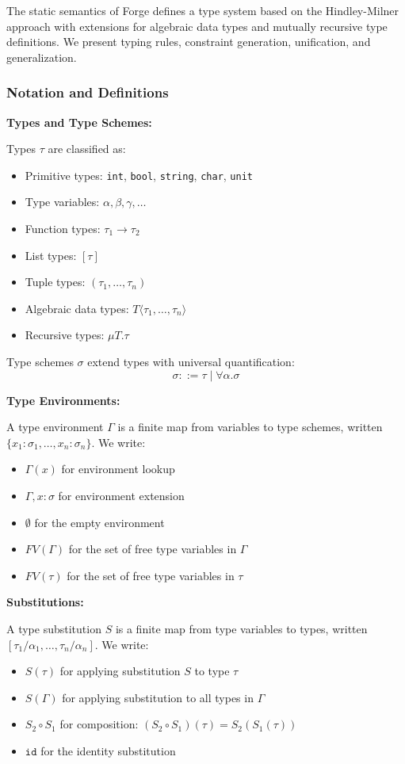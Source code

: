 \documentclass[conference,onecolumn]{IEEEtran}
\begin{document}
The static semantics of Forge defines a type system based on the Hindley-Milner approach with extensions for algebraic data types and mutually recursive type definitions. We present typing rules, constraint generation, unification, and generalization.

\subsubsection{Notation and Definitions}

\textbf{Types and Type Schemes:}

Types $\tau$ are classified as:
\begin{itemize}
\item Primitive types: \texttt{int}, \texttt{bool}, \texttt{string}, \texttt{char}, \texttt{unit}
\item Type variables: $\alpha, \beta, \gamma, \ldots$
\item Function types: $\tau_1 \to \tau_2$
\item List types: $[\tau]$
\item Tuple types: $(\tau_1, \ldots, \tau_n)$
\item Algebraic data types: $T\langle\tau_1, \ldots, \tau_n\rangle$
\item Recursive types: $\mu T.\tau$
\end{itemize}

Type schemes $\sigma$ extend types with universal quantification:
$$\sigma ::= \tau \mid \forall \alpha.\sigma$$

\textbf{Type Environments:}

A type environment $\Gamma$ is a finite map from variables to type schemes, written $\{x_1 : \sigma_1, \ldots, x_n : \sigma_n\}$. We write:
\begin{itemize}
\item $\Gamma(x)$ for environment lookup
\item $\Gamma, x : \sigma$ for environment extension
\item $\emptyset$ for the empty environment
\item $FV(\Gamma)$ for the set of free type variables in $\Gamma$
\item $FV(\tau)$ for the set of free type variables in $\tau$
\end{itemize}

\textbf{Substitutions:}

A type substitution $S$ is a finite map from type variables to types, written $[\tau_1/\alpha_1, \ldots, \tau_n/\alpha_n]$. We write:
\begin{itemize}
\item $S(\tau)$ for applying substitution $S$ to type $\tau$
\item $S(\Gamma)$ for applying substitution to all types in $\Gamma$
\item $S_2 \circ S_1$ for composition: $(S_2 \circ S_1)(\tau) = S_2(S_1(\tau))$
\item $\texttt{id}$ for the identity substitution
\end{itemize}
\end{document}
